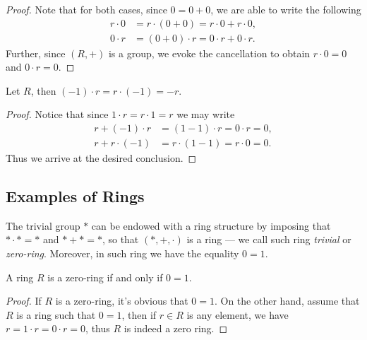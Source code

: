 %
\begin{proof}
Note that for both cases, since \(0 = 0 + 0\), we are able to write the
following
\begin{align*}
  r \cdot 0 &= r \cdot (0 + 0) = r \cdot 0 + r \cdot 0, \\
  0 \cdot r &= (0 + 0) \cdot r = 0 \cdot r + 0 \cdot r.
\end{align*}
Further, since \((R, +)\) is a group, we evoke the cancellation to obtain
\(r \cdot 0 = 0\) and \(0 \cdot r = 0\).
\end{proof}
%

%
\begin{corollary}
\label{cor:ring-additive-inverse}
Let \(R\), then \((-1) \cdot r = r \cdot (-1) = -r\).
\end{corollary}
%

%
\begin{proof}
Notice that since \(1 \cdot r = r \cdot 1 = r\) we may write
\begin{align*}
  r + (-1) \cdot r &= (1 - 1) \cdot r = 0 \cdot r = 0, \\
  r + r \cdot (-1) &= r \cdot (1 - 1) = r \cdot 0 = 0.
\end{align*}
Thus we arrive at the desired conclusion.
\end{proof}
%

\subsection{Examples of Rings}

%
\begin{example}
\label{exp:trivial-ring}
The trivial group \(*\) can be endowed with a ring structure by imposing that
\(* \cdot * = *\) and \(* + * = *\), so that \((*, +, \cdot)\) is a ring --- we
call such ring \emph{trivial} or \emph{zero-ring}. Moreover, in such ring we
have the equality \(0 = 1\).
\end{example}
%

%
\begin{corollary}
\label{cor:zero-ring-condition}
A ring \(R\) is a zero-ring if and only if \(0 = 1\).
\end{corollary}
%

%
\begin{proof}
If \(R\) is a zero-ring, it's obvious that \(0 = 1\). On the other hand, assume
that \(R\) is a ring such that \(0 = 1\), then if \(r \in R\) is any element, we
have \(r = 1 \cdot r = 0 \cdot r = 0\), thus \(R\) is indeed a zero ring.
\end{proof}
%

